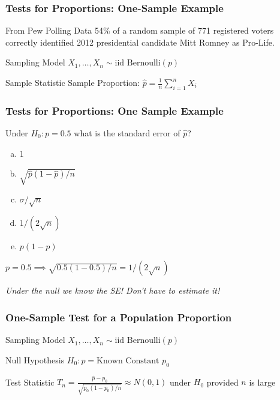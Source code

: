 \documentclass[handout]{beamer}
\begin{document}
\begin{frame}
	\frametitle{Tests for Proportions: One-Sample Example}
	\begin{block}
		{From Pew Polling Data}
		54\% of a random sample of 771 registered voters correctly identified 2012 presidential candidate Mitt Romney as Pro-Life.
	\end{block}
	\begin{block}
		{Sampling Model}
		$X_1, \hdots, X_{n} \sim \mbox{iid Bernoulli}(p)$
	\end{block}
	\begin{block}
		{Sample Statistic}
		Sample Proportion: $\displaystyle\widehat{p} = \frac{1}{n}\sum_{i=1}^{n} X_i$
	\end{block}

	\vspace{1em}

	\hfill \alert{}
\end{frame}
\begin{frame}
	\frametitle{Tests for Proportions: One Sample Example}
	Under $H_0\colon p = 0.5$ what is the standard error of $\widehat{p}$?

	\begin{enumerate}[(a)]
		\item $1$
		\item $\sqrt{\widehat{p}(1-\widehat{p})/n}$
		\item $\sigma/\sqrt{n}$
		\item $1/(2\sqrt{n})$
		\item $p(1-p)$ 
	\end{enumerate}
\pause
 \alert{$p=0.5 \implies \sqrt{0.5(1-0.5)/n} = 1/(2\sqrt{n})$}

 \vspace{1em}
 \emph{Under the null we know the SE! Don't have to estimate it!}

\end{frame}
\begin{frame}
	\frametitle{One-Sample Test for a Population Proportion}
	\begin{block}
		{Sampling Model}
		$X_1, \hdots, X_n \sim \mbox{iid Bernoulli}(p)$
	\end{block}
	\begin{block}
		{Null Hypothesis}
		$H_0 \colon p = \mbox{Known Constant } p_0$
	\end{block}
	\begin{block}
		{Test Statistic} 
		$\displaystyle T_n = \frac{\widehat{p} - p_0}{\sqrt{p_0(1-p_0)/n}} \approx N(0,1)$ under $H_0$ provided $n$ is large
	\end{block}
\end{frame}
\end{document}
